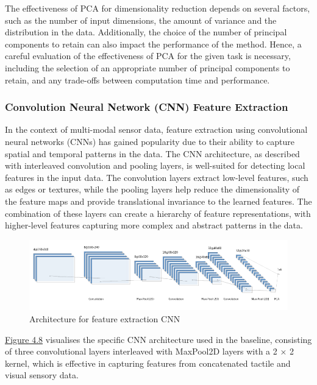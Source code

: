 \documentclass[11pt, a4paper]{report}
\begin{document}
The effectiveness of PCA for dimensionality reduction depends on several factors, such as the number of input dimensions, the amount of variance and the distribution in the data. Additionally, the choice of the number of principal components to retain can also impact the performance of the method. Hence, a careful evaluation of the effectiveness of PCA for the given task is necessary, including the selection of an appropriate number of principal components to retain, and any trade-offs between computation time and performance.


\subsubsection{Convolution Neural Network (CNN) Feature Extraction}\label{sec:4.4.2.2}
In the context of multi-modal sensor data, feature extraction using convolutional neural networks (CNNs) has gained popularity due to their ability to capture spatial and temporal patterns in the data. The CNN architecture, as described with interleaved convolution and pooling layers, is well-suited for detecting local features in the input data. The convolution layers extract low-level features, such as edges or textures, while the pooling layers help reduce the dimensionality of the feature maps and provide translational invariance to the learned features. The combination of these layers can create a hierarchy of feature representations, with higher-level features capturing more complex and abstract patterns in the data.

\begin{figure}[H]
    \includegraphics[scale=0.7]{docs/Project Report/Media/4_4_2_nn.png}
    \caption{Architecture for feature extraction CNN}
    \label{fig:4.8}
\end{figure}

\hyperref[fig:4.8]{Figure 4.8} visualises the specific CNN architecture used in the baseline, consisting of three convolutional layers interleaved with MaxPool2D layers with a 2 × 2 kernel, which is effective in capturing features from concatenated tactile and visual sensory data. 
\end{document}
